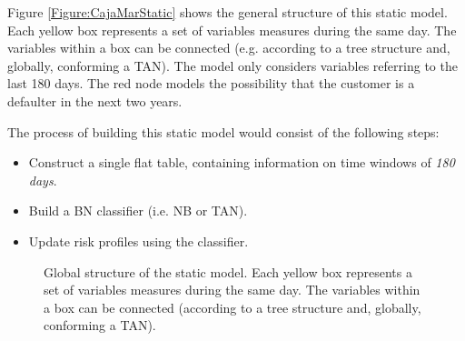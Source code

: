 Figure \ref{Figure:CajaMarStatic} shows the general structure of this static model. Each yellow box represents a set of variables measures during the same day.
The variables within a box can be connected (e.g. according to a tree structure and, globally, conforming a TAN). The model only considers variables referring to the last 180 days. The red node models the possibility that the customer is a defaulter in the next two years. 

The process of building this static model would consist of the following steps:


\begin{itemize}
\item Construct a single flat table, containing information on time windows of \emph{180 days}.
\item Build a BN classifier (i.e. NB or TAN). 
\item Update risk profiles using the classifier.
\end{itemize}

\begin{figure}[ht]
\begin{center}
\end{center}
\caption{\label{Figure:CajaMarStatic}Global structure of the static model. Each yellow box represents a set of variables measures during the same day.
The variables within a box can be connected (according to a tree structure and, globally, conforming a TAN).}
\label{fig:static}
\end{figure}


